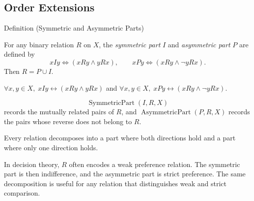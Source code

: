 
\subsection{Order Extensions}


\begin{definitionbox}{Definition (Symmetric and Asymmetric Parts)}
\begin{definition}\label{def:sym-asym}
For any binary relation $R$ on $X$, the \emph{symmetric part} $I$ and
\emph{asymmetric part} $P$ are defined by
\[
  xIy \Longleftrightarrow (xRy \wedge yRx),
  \qquad
  xPy \Longleftrightarrow (xRy \wedge \neg yRx).
\]
Then $R=P\cup I$.
\end{definition}
\end{definitionbox}

\begin{remark*}
$\forall x,y\in X,\; xIy\leftrightarrow(xRy\wedge yRx)$ and
$\forall x,y\in X,\; xPy\leftrightarrow(xRy\wedge\neg yRx)$.
\end{remark*}

\begin{remark*}
\[
  \operatorname{SymmetricPart}(I,R,X)
\] records the mutually related pairs of
$R$, and $\operatorname{AsymmetricPart}(P,R,X)$ records the pairs whose reverse
does not belong to $R$.
\end{remark*}

\begin{remark*}[Interpretation]
Every relation decomposes into a part where both directions hold and a part
where only one direction holds.
\end{remark*}

\begin{remark*}[Exposition]
In decision theory, $R$ often encodes a weak preference relation. The symmetric
part is then indifference, and the asymmetric part is strict preference. The
same decomposition is useful for any relation that distinguishes weak and
strict comparison.
\end{remark*}

